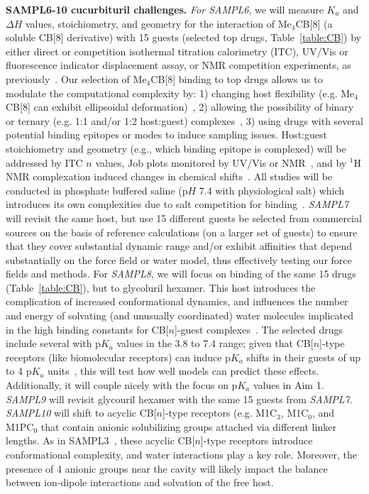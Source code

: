 \documentclass[11pt]{article}
\begin{document}
\textbf{SAMPL6-10 cucurbituril challenges.} 
\emph{For SAMPL6}, we will measure $K_a$ and $\Delta H$ values, stoichiometry, and geometry for the interaction of Me$_4$CB[8] (a soluble CB[8] derivative) with 15 guests (selected top drugs, Table~\ref{table:CB}) by either direct or competition isothermal titration calorimetry (ITC), UV/Vis or fluorescence indicator displacement assay, or NMR competition experiments, as previously~\cite{cao_attomolar_2014, liu_cucurbituril_2005, ma_acyclic_2010, she_glycoluril-derived_2016}.  
Our selection of Me$_4$CB[8] binding to top drugs allows us to modulate the computational complexity by: 1) changing host flexibility (e.g. Me$_4$CB[8] can exhibit ellipsoidal deformation)~\cite{vinciguerra_synthesis_2015}, 2) allowing the possibility of binary or ternary (e.g. 1:1 and/or 1:2 host:guest) complexes~\cite{ko_supramolecular_2007, barrow_cucurbituril-based_2015, urbach_molecular_2011}, 3) using drugs with several potential binding epitopes or modes to induce sampling issues.  Host:guest stoichiometry and geometry (e.g., which binding epitope is complexed) will be addressed by ITC $n$ values, Job plots monitored by UV/Vis or NMR~\cite{connors_binding_1987}, and by $^1$H NMR complexation induced changes in chemical shifts~\cite{masson_cucurbituril_2012}.  
All studies will be conducted in phosphate buffered saline (p$H$ 7.4 with physiological salt) which introduces its own complexities due to salt competition for binding~\cite{marquez_mechanism_2004, mobley_predicting_2016}. 
\emph{SAMPL7} will revisit the same host, but use 15 different guests be selected from commercial sources on the basis of reference calculations (on a larger set of guests) to ensure that they cover substantial dynamic range and/or exhibit affinities that depend substantially on the force field or water model, thus effectively testing our force fields and methods.
For \emph{SAMPL8}, we will focus on binding of the same 15 drugs (Table~\ref{table:CB}), but to glycoluril hexamer. 
This host introduces the complication of increased conformational dynamics, and influences the number and energy of solvating (and unusually coordinated) water molecules implicated in the high binding constants for CB[$n$]-guest complexes~\cite{biedermann_release_2012, biedermann_hydrophobic_2014}.  
The selected drugs include several with p$K_a$ values in the 3.8 to 7.4 range; given that CB[$n$]-type receptors (like biomolecular receptors) can induce p$K_a$ shifts in their guests of up to 4 p$K_a$ units~\cite{saleh_activation_2008, nau_deep_2011, ghosh_strategic_2012}, this will test how well models can predict these effects. 
Additionally, it will couple nicely with the focus on p$K_a$ values in Aim 1.
\emph{SAMPL9} will revisit glycouril hexamer with the same 15 guests from \emph{SAMPL7}.
\emph{SAMPL10} will shift to acyclic CB[$n$]-type receptors (e.g. M1C$_3$, M1C$_0$, and M1PC$_0$ that contain anionic solubilizing groups attached via different linker lengths.  
As in SAMPL3~\cite{muddana_sampl3_2012}, these acyclic CB[$n$]-type receptors introduce conformational complexity, and water interactions play a key role.
Moreover, the presence of 4 anionic groups near the cavity will likely impact the balance between ion-dipole interactions and solvation of the free host.
\end{document}
